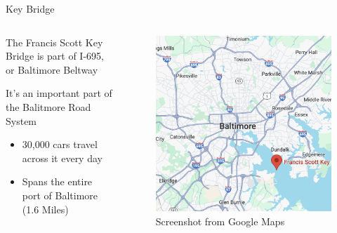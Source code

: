 \documentclass{beamer}
\numberwithin{figure}{section} %
\numberwithin{table}{section} %
\begin{document}
\begin{frame}{Key Bridge}
    \begin{columns}
        \begin{column}{0.5\textwidth}
            The Francis Scott Key Bridge is part of I-695, or Baltimore Beltway

            It's an important part of the Balitmore Road System
            \begin{itemize}
                \item 30,000 cars travel across it every day
                \item Spans the entire port of Baltimore (1.6 Miles)
            \end{itemize}
        \end{column}

        \begin{column}{0.5\textwidth}
            \begin{figure}
                \centering
                \includegraphics[width=\textwidth]{pics/map_of_bridge.png} \\
                {\tiny Screenshot from Google Maps}
            \end{figure}
        \end{column}
    \end{columns}
\end{frame}
\end{document}
